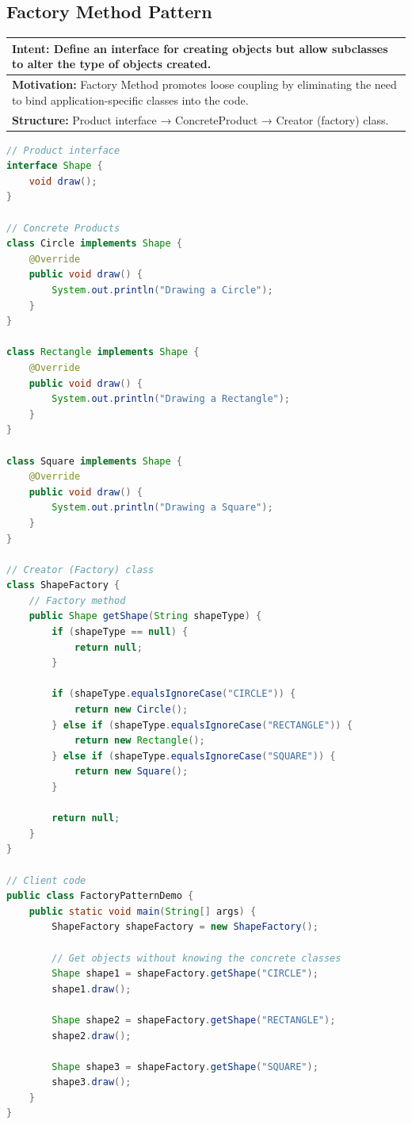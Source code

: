 \documentclass[12pt,a4paper]{article}
\begin{document}
\subsection{Factory Method Pattern}
\label{subsec:factory-method}

\begin{tabular}{p{}}
    \hline
    \rowcolor{lightgray}
    \textbf{Intent:} Define an interface for creating objects but allow subclasses to alter the type of objects created. \\
    \hline
    \textbf{Motivation:} Factory Method promotes loose coupling by eliminating the need to bind application-specific classes into the code. \\
    \hline
    \textbf{Structure:} Product interface → ConcreteProduct → Creator (factory) class. \\
    \hline
\end{tabular}

\vspace{1em}

\begin{lstlisting}[language=Java, caption={Factory Method Pattern Implementation in Java}, label=lst:factory-method]
// Product interface
interface Shape {
    void draw();
}

// Concrete Products
class Circle implements Shape {
    @Override
    public void draw() {
        System.out.println("Drawing a Circle");
    }
}

class Rectangle implements Shape {
    @Override
    public void draw() {
        System.out.println("Drawing a Rectangle");
    }
}

class Square implements Shape {
    @Override
    public void draw() {
        System.out.println("Drawing a Square");
    }
}

// Creator (Factory) class
class ShapeFactory {
    // Factory method
    public Shape getShape(String shapeType) {
        if (shapeType == null) {
            return null;
        }
        
        if (shapeType.equalsIgnoreCase("CIRCLE")) {
            return new Circle();
        } else if (shapeType.equalsIgnoreCase("RECTANGLE")) {
            return new Rectangle();
        } else if (shapeType.equalsIgnoreCase("SQUARE")) {
            return new Square();
        }
        
        return null;
    }
}

// Client code
public class FactoryPatternDemo {
    public static void main(String[] args) {
        ShapeFactory shapeFactory = new ShapeFactory();
        
        // Get objects without knowing the concrete classes
        Shape shape1 = shapeFactory.getShape("CIRCLE");
        shape1.draw();
        
        Shape shape2 = shapeFactory.getShape("RECTANGLE");
        shape2.draw();
        
        Shape shape3 = shapeFactory.getShape("SQUARE");
        shape3.draw();
    }
}
\end{lstlisting}
\end{document}
